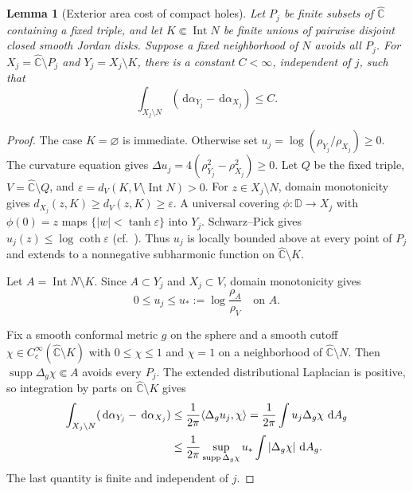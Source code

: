 \documentclass[11pt,reqno]{amsart}
\newcommand{\D}{\mathbb D}
\newcommand{\sphere}{\widehat{\mathbb C}}
\newcommand{\dd}{\,\mathrm d}
\newtheorem{lemma}[theorem]{Lemma}
\theoremstyle{definition}
\numberwithin{equation}{section}
\begin{document}
\begin{lemma}[Exterior area cost of compact holes]\label{core:holes}
Let $P_j$ be finite subsets of $\sphere$ containing a fixed triple, and
let $K\Subset\operatorname{Int}N$ be finite unions of pairwise disjoint
closed smooth Jordan disks. Suppose a fixed neighborhood of $N$ avoids
all $P_j$. For $X_j=\sphere\setminus P_j$ and $Y_j=X_j\setminus K$,
there is a constant $C<\infty$, independent of $j$, such that
\begin{equation}\label{core:holes-bound}
 \int_{X_j\setminus N}
       (\dd\alpha_{Y_j}-\dd\alpha_{X_j})\le C.
\end{equation}
\end{lemma}
\begin{proof}
The case $K=\varnothing$ is immediate. Otherwise set
$u_j=\log(\rho_{Y_j}/\rho_{X_j})\ge0$. The curvature equation gives
$\Delta u_j=4(\rho_{Y_j}^2-\rho_{X_j}^2)\ge0$.
Let $Q$ be the fixed triple, $V=\sphere\setminus Q$, and
$\varepsilon=d_V(K,V\setminus\operatorname{Int}N)>0$.
For $z\in X_j\setminus N$, domain monotonicity gives
$d_{X_j}(z,K)\ge d_V(z,K)\ge\varepsilon$.
A universal covering $\phi:\D\to X_j$ with $\phi(0)=z$ maps
$\{|w|<\tanh\varepsilon\}$ into $Y_j$. Schwarz--Pick gives
$u_j(z)\le\log\coth\varepsilon$
(cf.\ \cite[Proposition~3.4]{MBRG}).
Thus $u_j$ is locally bounded above at every point of $P_j$ and extends
to a nonnegative subharmonic function on $\sphere\setminus K$.

Let $A=\operatorname{Int}N\setminus K$. Since $A\subset Y_j$ and
$X_j\subset V$, domain monotonicity gives
\begin{equation}\label{core:holes-comparison}
 0\le u_j\le u_*:=\log\frac{\rho_A}{\rho_V}
 \quad\text{on }A.
\end{equation}

Fix a smooth conformal metric $g$ on the sphere and a smooth cutoff
$\chi\in C_c^\infty(\sphere\setminus K)$ with $0\le\chi\le1$ and
$\chi=1$ on a neighborhood of $\sphere\setminus N$.
Then $\operatorname{supp}\Delta_g\chi\Subset A$
avoids every $P_j$. The extended distributional Laplacian is positive,
so integration by parts on $\sphere\setminus K$ gives
\begin{align}\label{core:holes-cutoff}
 \int_{X_j\setminus N}(\dd\alpha_{Y_j}-\dd\alpha_{X_j})
 &\le\frac1{2\pi}\langle\Delta_g u_j,\chi\rangle
 =\frac1{2\pi}\int u_j\Delta_g\chi\,\dd A_g\notag\\
 &\le\frac1{2\pi}
 \sup_{\operatorname{supp}\Delta_g\chi}u_*
 \int|\Delta_g\chi|\,\dd A_g.
\end{align}
The last quantity is finite and independent of $j$.
\end{proof}
\end{document}
